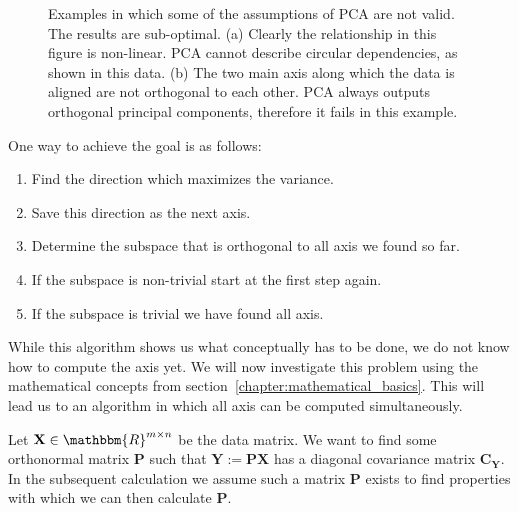 \begin{figure}
	\centering
	\begin{subfigure}{0.45\linewidth}
		
		\caption{}
		\label{fig:pca_fails_nonlinear}
	\end{subfigure}
	\hfill
	\begin{subfigure}{0.45\linewidth}
		
		\caption{}
		\label{fig:pca_fails_nonorthogonal}
	\end{subfigure}
	
	\caption{Examples in which some of the assumptions of PCA are not valid. The results are sub-optimal. \newline (a) Clearly the relationship in this figure is non-linear. PCA cannot describe circular dependencies, as shown in this data. \newline (b) The two main axis along which the data is aligned are not orthogonal to each other. PCA always outputs orthogonal principal components, therefore it fails in this example.}
	\label{fig:pca_fails}
\end{figure}

One way to achieve the goal is as follows:
\begin{enumerate}
	\item Find the direction which maximizes the variance.
	\item Save this direction as the next axis.
	\item Determine the subspace that is orthogonal to all axis we found so far.
	\item If the subspace is non-trivial start at the first step again.
	\item If the subspace is trivial we have found all axis.
\end{enumerate}

While this algorithm shows us what conceptually has to be done, we do not know how to compute the axis yet. We will now investigate this problem using the mathematical concepts from section~\ref{chapter:mathematical_basics}. This will lead us to an algorithm in which all axis can be computed simultaneously.

Let $\mathbf{X} \in \mathbbm{R}^{m\times n}$ be the data matrix. We want to find some orthonormal matrix $\mathbf{P}$ such that $\mathbf{Y}:=\mathbf{PX}$ has a diagonal covariance matrix $\mathbf{C}_{\mathbf{Y}}$. In the subsequent calculation we assume such a matrix $\mathbf{P}$ exists to find properties with which we can then calculate $\mathbf{P}$.

